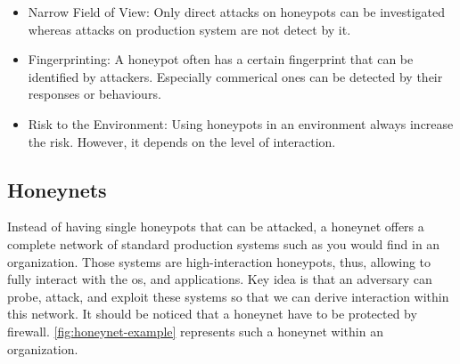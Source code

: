 \begin{itemize}
    \item Narrow Field of View: Only direct attacks on honeypots can be investigated whereas attacks on production system are not detect by it.
    \item Fingerprinting: A honeypot often has a certain fingerprint that can be identified by attackers.
          Especially commerical ones can be detected by their responses or behaviours.
    \item Risk to the Environment: Using honeypots in an environment always increase the risk.
          However, it depends on the level of interaction.
\end{itemize}

\subsection{Honeynets}

Instead of having single honeypots that can be attacked, a honeynet offers a complete network of standard production systems such as you would find in an organization.
Those systems are high-interaction honeypots, thus, allowing to fully interact with the \ac{os}, and applications.
Key idea is that an adversary can probe, attack, and exploit these systems so that we can derive interaction within this network.
It should be noticed that a honeynet have to be protected by firewall. \autoref{fig:honeynet-example} represents such a honeynet within an organization.

